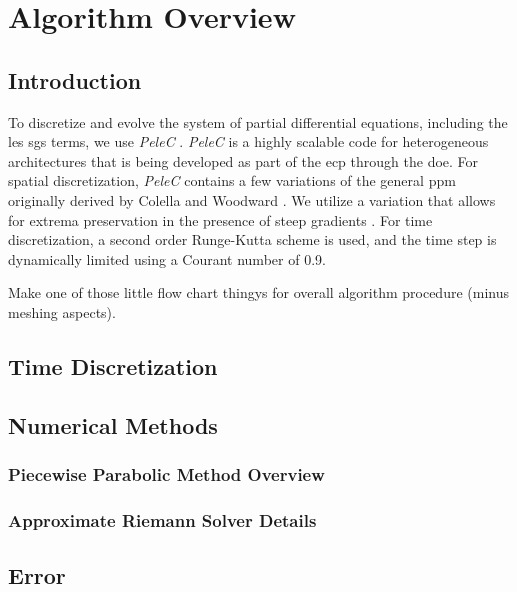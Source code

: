 \chapter{Algorithm Overview}
\section{Introduction}
To discretize and evolve the system of partial differential equations, including the \gls{les} \gls{sgs} terms, we use \textit{PeleC} \cite{PeleC1, PeleC2}. \textit{PeleC} is a highly scalable code for heterogeneous architectures that is being developed as part of the \gls{ecp} through the \gls{doe}. For spatial discretization, \textit{PeleC} contains a few variations of the general \gls{ppm} originally derived by Colella and Woodward \cite{1984JCoPPPM}. We utilize a variation that allows for extrema preservation in the presence of steep gradients \cite{MILLER200226, COLELLA20087069}. For time discretization, a second order Runge-Kutta scheme is used, and the time step is dynamically limited using a Courant number of 0.9. 

Make one of those little flow chart thingys for overall algorithm procedure (minus meshing aspects).
\section{Time Discretization}



\section{Numerical Methods}
\subsection{Piecewise Parabolic Method Overview}

\subsection{Approximate Riemann Solver Details}
\section{Error}